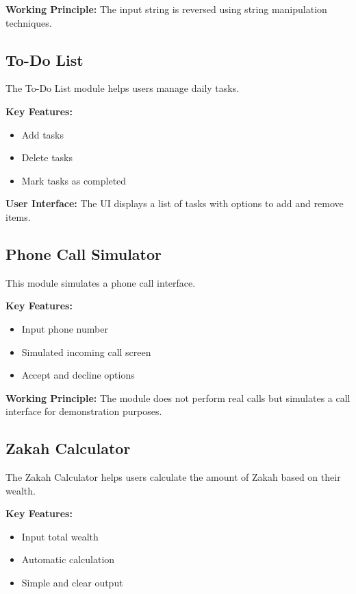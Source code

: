 \documentclass{article}
\begin{document}
\textbf{Working Principle:}
The input string is reversed using string manipulation techniques.

\subsection{To-Do List}

The To-Do List module helps users manage daily tasks.

\textbf{Key Features:}
\begin{itemize}
\item Add tasks
\item Delete tasks
\item Mark tasks as completed
\end{itemize}

\textbf{User Interface:}
The UI displays a list of tasks with options to add and remove items.

\subsection{Phone Call Simulator}

This module simulates a phone call interface.

\textbf{Key Features:}
\begin{itemize}
\item Input phone number
\item Simulated incoming call screen
\item Accept and decline options
\end{itemize}

\textbf{Working Principle:}
The module does not perform real calls but simulates a call interface for demonstration purposes.

\subsection{Zakah Calculator}

The Zakah Calculator helps users calculate the amount of Zakah based on their wealth.

\textbf{Key Features:}
\begin{itemize}
\item Input total wealth
\item Automatic calculation
\item Simple and clear output
\end{itemize}
\end{document}
